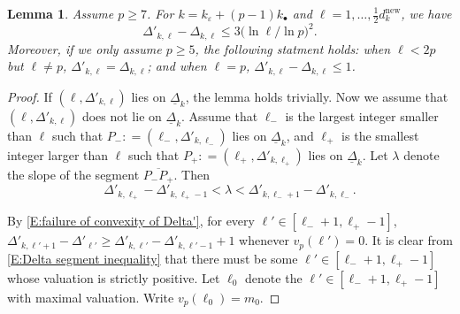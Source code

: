 \documentclass[12pt]{amsart}
\newtheorem{lemma}[subsection]{Lemma}
\theoremstyle{definition}
\numberwithin{equation}{subsection}
\newcommand{\new}{\mathrm{new}}
\begin{document}
\begin{lemma}
\label{L:Delta - Delta' bound}
Assume $p\geq 7$. For $k =k_\varepsilon  + (p-1)k_{\bullet}$ and $\ell = 1,\dots, \frac 12 d_{k}^\new$, we have
\begin{equation}
\label{E:Delta - Delta' bound}\Delta'_{k, \ell} - 
\Delta_{k, \ell} \leq  3 \big( \ln \ell / \ln p \big)^2.
\end{equation}
Moreover, if we only assume $p\geq 5$, the following statment holds: when $\ell < 2p$ but $\ell \neq p$, $\Delta'_{k, \ell} = \Delta_{k, \ell}$; and when $\ell =p$, $\Delta'_{k, \ell}-\Delta_{k, \ell} \leq 1$.
\end{lemma}
\begin{proof}
If $(\ell, \Delta'_{k,\ell})$ lies on $\underline \Delta_k$, the lemma holds trivially. Now we assume that $(\ell,\Delta'_{k,\ell})$ does not lie on $\underline \Delta_k$. Assume that $\ell_-$ is the largest integer smaller than $\ell$ such that $P_-: =(\ell_-, \Delta'_{k,\ell_-})$ lies on $\underline \Delta_k$, and  $\ell_+$ is the smallest integer larger than $\ell$ such that $P_+: =(\ell_+, \Delta'_{k,\ell_+})$ lies on $\underline \Delta_k$.  Let $\lambda$ denote the slope of the segment $\overline{P_-P_+}$. Then 
\begin{equation}
\label{E:Delta segment inequality}
\Delta'_{k, \ell_+}-\Delta'_{k, \ell_+-1}<  \lambda< \Delta'_{k, \ell_-+1}-\Delta'_{k, \ell_-} .
\end{equation}

By \eqref{E:failure of convexity of Delta'}, for every $\ell' \in [\ell_-+1, \ell_+-1]$, $ \Delta'_{k, \ell'+1} -  \Delta'_{\ell'} \geq  \Delta'_{k, \ell'}- \Delta'_{k, \ell'-1} + 1$ whenever $v_p(\ell')=0$. It is clear from \eqref{E:Delta segment inequality} that there must be some $\ell' \in [\ell_-+1, \ell_+-1]$ whose valuation is strictly positive. Let $\ell_0$ denote the $\ell' \in [\ell_-+1, \ell_+-1]$ with maximal valuation. Write $v_p(\ell_0)=m_0$.


\end{proof}
\end{document}
